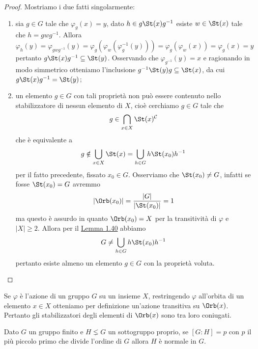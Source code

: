 \documentclass[11pt]{scrartcl}
\begin{document}
\begin{proof}
    Mostriamo i due fatti singolarmente:
    \begin{enumerate}[(1)]
        \item sia $g \in G$ tale che $\varphi_g(x) = y$, dato 
        $h \in g\St(x)g^{-1}$ esiste $w \in \St(x)$ tale che $h = gwg^{-1}$. 
        Allora
        \[
            \varphi_h(y) = \varphi_{gwg^{-1}}(y) = 
            \varphi_g(\varphi_w(\varphi_g^{-1}(y))) = \varphi_g(\varphi_w(x)) =
            \varphi_g(x) = y
        \]pertanto $g\St(x)g^{-1} \subseteq \St(y)$. Osservando che 
        $\varphi_{g^{-1}}(y) = x$ e ragionando in modo simmetrico otteniamo
        l'inclusione $g^{-1}\St(y)g \subseteq \St(x)$, da cui $g\St(x)g^{-1} = \St(y)$;
        \item un elemento $g \in G$ con tali proprietà non può essere contenuto 
        nello stabilizzatore di nessun elemento di $X$, cioè cerchiamo $g \in G$
        tale che
        \[
            g \in \bigcap_{x \in X}\St(x)^{\mathcal{C}}
        \]
        che è equivalente a
        \[
            g \notin \bigcup_{x \in X} \St(x) = \bigcup_{h \in G}h\St(x_0)h^{-1}
        \]per il fatto precedente, fissato $x_0 \in G$. Osserviamo che 
        $\St(x_0) \neq G$, infatti se fosse $\St(x_0) = G$ avremmo 
        \[
            |\Orb(x_0)| = \frac{|G|}{|\St(x_0)|} = 1
        \]ma questo è assurdo in quanto $\Orb(x_0) = X$ per la transitività di 
        $\varphi$ e $|X|\geqslant 2$. Allora per il \hyperref[lemma1.40]{Lemma 1.40}
        abbiamo 
        \[
            G \neq \bigcup_{h \in G}h\St(x_0)h^{-1}
        \]pertanto esiste almeno un elemento $g\in G$ con la proprietà voluta.
    \end{enumerate}
\end{proof}

\begin{remark}
    Se $\varphi$ è l'azione di un gruppo $G$ su un insieme $X$, restringendo
    $\varphi$ all'orbita di un elemento $x \in X$ otteniamo per definizione
    un'azione transitiva su $\Orb(x)$. Pertanto gli stabilizzatori degli elementi 
    di $\Orb(x)$ sono tra loro coniugati.
\end{remark}

\begin{proposition}
    Dato $G$ un gruppo finito e $H \lneq G$ un sottogruppo proprio, se $[G:H] = p$
    con $p$ il più piccolo primo che divide l'ordine di $G$ allora $H$ è normale
    in $G$.
\end{proposition}
\end{document}
